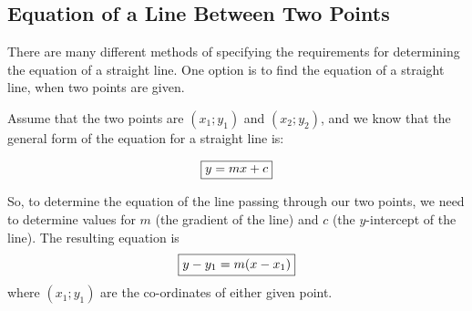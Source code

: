 \subsection{Equation of a Line Between Two Points}

There are many different methods of specifying the requirements for determining the equation of a straight line. One option is to find the equation of a straight line, when two points are given.

Assume that the two points are $(x_1;y_1)$ and $(x_2;y_2)$, and we know that the general form of the equation for a straight line is:

\begin{equation}\framebox{$y=mx+c$} \label{eq:mg:c:strline} \end{equation}

So, to determine the equation of the line passing through our two points, we need to determine values for $m$ (the gradient of the line) and $c$ (the $y$-intercept of the line). The resulting equation is
\begin{equation}\framebox{$y - y_1 = m(x-x_1)$}\label{eq:mg:c:strline2} \end{equation}
where $(x_1;y_1)$ are the co-ordinates of either given point.


